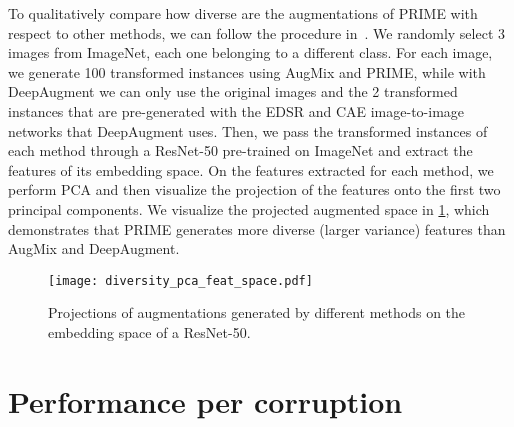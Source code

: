 \documentclass[runningheads]{llncs}
\begin{document}
To qualitatively compare how diverse are the augmentations of PRIME with respect to other methods, we can follow the procedure in~\cite{augmax2021}. We randomly select 3 images from ImageNet, each one belonging to a different class. For each image, we generate 100 transformed instances using AugMix and PRIME, while with DeepAugment we can only use the original images and the 2 transformed instances that are pre-generated with the EDSR and CAE image-to-image networks that DeepAugment uses. Then, we pass the transformed instances of each method through a ResNet-50 pre-trained on ImageNet and extract the features of its embedding space. On the features extracted for each method, we perform PCA and then visualize the projection of the features onto the first two principal components. We visualize the projected augmented space in \cref{fig:prime-diversity-pca-feat-space}, which demonstrates that PRIME generates more diverse (larger variance) features than AugMix and DeepAugment.

\clearpage
\newpage

\begin{figure}[!ht]
    \begin{center}
    \texttt{[image: diversity\_pca\_feat\_space.pdf]}
    \end{center}
    \caption{Projections of augmentations generated by different methods on the embedding space of a ResNet-50.}
    \label{fig:prime-diversity-pca-feat-space}
\end{figure}

\section{Performance per corruption}
\label{app:performance-per-corruption}
\end{document}
